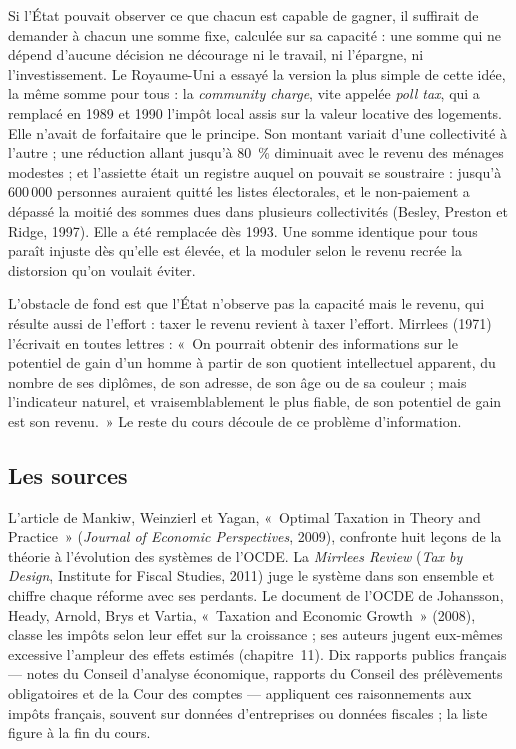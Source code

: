\documentclass[11pt,a4paper]{article}
\begin{document}
Si l'État pouvait observer ce que chacun est capable de gagner, il suffirait de demander à chacun
une somme fixe, calculée sur sa capacité : une somme qui ne dépend d'aucune décision ne décourage
ni le travail, ni l'épargne, ni l'investissement. Le Royaume-Uni a essayé la version la plus simple
de cette idée, la même somme pour tous : la \emph{community charge}, vite appelée \emph{poll tax},
qui a remplacé en 1989 et 1990 l'impôt local assis sur la valeur locative des logements. Elle
n'avait de forfaitaire que le principe. Son montant variait d'une collectivité à l'autre ; une
réduction allant jusqu'à 80~\% diminuait avec le revenu des ménages modestes ; et l'assiette était
un registre auquel on pouvait se soustraire : jusqu'à 600\,000 personnes auraient quitté les listes
électorales, et le non-paiement a dépassé la moitié des sommes dues dans plusieurs collectivités
(Besley, Preston et Ridge, 1997). Elle a été remplacée dès 1993. Une somme identique pour tous
paraît injuste dès qu'elle est élevée, et la moduler selon le revenu recrée la distorsion qu'on
voulait éviter.

L'obstacle de fond est que l'État n'observe pas la capacité mais le revenu, qui résulte aussi de
l'effort : taxer le revenu revient à taxer l'effort. Mirrlees (1971) l'écrivait en toutes lettres :
«~On pourrait obtenir des informations sur le potentiel de gain d'un homme à partir de son
quotient intellectuel apparent, du nombre de ses diplômes, de son adresse, de son âge ou de sa
couleur ; mais l'indicateur naturel, et vraisemblablement le plus fiable, de son potentiel de gain
est son revenu.~» Le reste du cours découle de ce problème d'information.

\subsection{Les sources}

L'article de Mankiw, Weinzierl et Yagan, «~Optimal Taxation in Theory and Practice~»
(\emph{Journal of Economic Perspectives}, 2009), confronte huit leçons de la théorie à l'évolution
des systèmes de l'OCDE. La \emph{Mirrlees Review} (\emph{Tax by Design}, Institute for Fiscal
Studies, 2011) juge le système dans son ensemble et chiffre chaque réforme avec ses perdants. Le
document de l'OCDE de Johansson, Heady, Arnold, Brys et Vartia, «~Taxation and Economic Growth~»
(2008), classe les impôts selon leur effet sur la croissance ; ses auteurs jugent eux-mêmes
excessive l'ampleur des effets estimés (chapitre~11). Dix rapports publics français --- notes du
Conseil d'analyse économique, rapports du Conseil des prélèvements obligatoires et de la Cour des
comptes --- appliquent ces raisonnements aux impôts français, souvent sur données d'entreprises ou
données fiscales ; la liste figure à la fin du cours.
\end{document}

